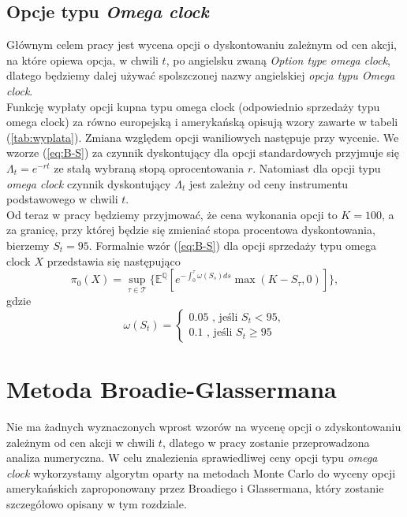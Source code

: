\documentclass[12pt]{article}
\begin{document}
\subsection{Opcje typu \textit{Omega clock}}
\label{opcje}
Głównym celem pracy jest wycena opcji o dyskontowaniu zależnym od cen akcji, na które opiewa opcja, w chwili $t$, po angielsku zwaną \textit{Option type omega clock}, dlatego będziemy dalej używać spolszczonej nazwy angielskiej \textit{opcja typu Omega clock}. \\

Funkcję wypłaty opcji kupna typu omega clock (odpowiednio sprzedaży typu omega clock) za równo europejską i amerykańską opisują wzory zawarte w tabeli (\ref{tab:wyplata}).
Zmiana względem opcji waniliowych następuje przy wycenie. We wzorze (\ref{eq:B-S}) za czynnik dyskontujący dla opcji standardowych przyjmuje się $\Lambda_t = e^{-rt}$ ze stałą wybraną stopą oprocentowania $r$. Natomiast dla opcji typu \textit{omega clock} czynnik dyskontujący $\Lambda_t$ jest zależny od ceny instrumentu podstawowego w chwili $t$.\\

Od teraz w pracy będziemy przyjmować, że cena wykonania opcji to $K = 100$, a za granicę, przy której będzie się zmieniać stopa procentowa dyskontowania, bierzemy $S_t = 95$. Formalnie wzór (\ref{eq:B-S}) dla opcji sprzedaży typu omega clock $X$ przedstawia się następująco
\begin{equation}
\label{eq:B-S_omega}
\pi_0(X) = \sup_{\tau \in \mathcal{T}}\{ \mathbb{E}^{\mathbb{Q}} [e^{-\int_0^{\tau} \omega(S_s)ds} \max(K-S_{\tau},0)] \},
\end{equation}
gdzie
\begin{equation}
\label{eq:r}
\omega(S_t)=  \left\{ \begin{array}{ll}
0.05 \textrm{ , jeśli }S_t <95,\\
0.1 \textrm { , jeśli }S_t \geq 95
\end{array} \right.
\end{equation}
\section{Metoda Broadie-Glassermana}

Nie ma żadnych wyznaczonych wprost wzorów na wycenę opcji o zdyskontowaniu zależnym od cen akcji w chwili $t$, dlatego w pracy zostanie przeprowadzona analiza numeryczna.
\newline
\newline
W celu znalezienia sprawiedliwej ceny opcji typu \textit{omega clock} wykorzystamy algorytm oparty na metodach Monte Carlo do wyceny opcji amerykańskich zaproponowany przez Broadiego i Glassermana, który zostanie szczegółowo opisany w tym rozdziale.
\end{document}

